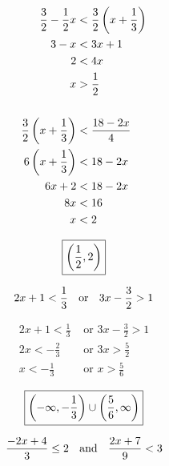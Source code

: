 \documentclass[letterpaper, landscape]{exam}
\begin{document}
\begin{questions}
      \begin{solution}
        \begin{align*}
           \frac{3}{2} - \frac{1}{2} x & < \frac{3}{2} \del{ x + \frac{1}{3} } \\
           3 - x                       & < 3x + 1 \\
           2                           & < 4x \\
           x                           & > \frac{1}{2} \\
           \\
           \frac{3}{2} \del{ x + \frac{1}{3} } & < \frac{18 - 2x}{4} \\
           6 \del{ x + \frac{1}{3} }           & < 18 - 2x \\
           6x + 2                              & < 18 - 2x \\
           8x                                  & < 16 \\
           x                                   & < 2 \\
        \end{align*}

        \[
          \boxed{ \intoo{ \frac{1}{2}, 2 } }
        \]

      \end{solution}

    \ifprintanswers{}
      \newpage
    \fi

    \question[10]
      \[ 
        2x + 1 < \frac{1}{3} \text { \hspace{0.1cm} or \hspace{0.1cm} } 3x - \frac{3}{2} > 1 
      \]

      \begin{solution}
        \begin{align*}
          2x + 1 < \frac{1}{3} & \text{ or } 3x - \frac{3}{2} > 1 \\
          2x < -\frac{2}{3}    & \text{ or } 3x > \frac{5}{2} \\
          x < -\frac{1}{3}     & \text{ or } x > \frac{5}{6} \\
        \end{align*}
        \[
          \boxed{ \intoo{ -\infty, -\frac{1}{3} } \cup \intoo{ \frac{5}{6}, \infty } }
        \]
      \end{solution}

    \question[10]
      \[ 
        \frac{-2x + 4}{3} \leq 2 \text{ \hspace{0.1cm} and \hspace{0.1cm} } \frac{2x + 7}{9} < 3 
      \]


\end{questions}
\end{document}
